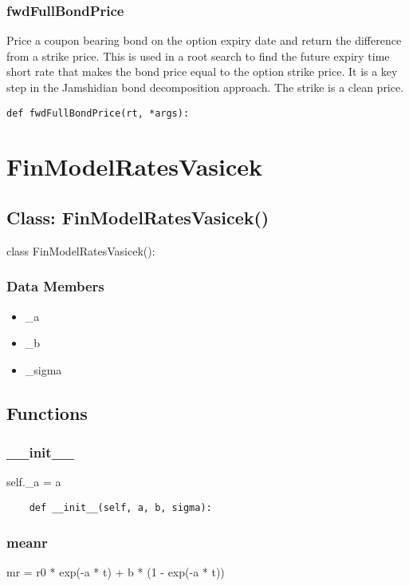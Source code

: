 \documentclass[twoside,11pt]{book}
\begin{document}
\subsubsection*{{\bf fwdFullBondPrice}}
Price a coupon bearing bond on the option expiry date and return the difference from a strike price. This is used in a root search to find the future expiry time short rate that makes the bond price equal to the option strike price. It is a key step in the Jamshidian bond decomposition approach. The strike is a clean price.  

\begin{lstlisting}
def fwdFullBondPrice(rt, *args):
\end{lstlisting}

\newpage
\section{FinModelRatesVasicek}

\subsection*{Class: FinModelRatesVasicek()}
class FinModelRatesVasicek(): 

\subsubsection*{Data Members}
\begin{itemize}
\item{\_a}
\item{\_b}
\item{\_sigma}
\end{itemize}

\subsection*{Functions}

\subsubsection*{{\bf \_\_init\_\_}}
self.\_a = a 

\begin{lstlisting}
    def __init__(self, a, b, sigma):
\end{lstlisting}

\subsubsection*{{\bf meanr}}
mr = r0 * exp(-a * t) + b * (1 - exp(-a * t)) 
\end{document}
